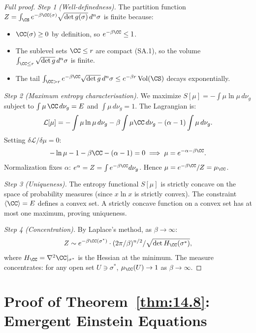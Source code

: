 \begin{proof}[Full proof]
\emph{Step 1 (Well-definedness).}
The partition function $Z = \int_{\CS} e^{-\beta\CC(\sigma)}
\sqrt{\det g(\sigma)}\,d^n\sigma$ is finite because:
\begin{itemize}
  \item $\CC(\sigma) \geq 0$ by definition, so
    $e^{-\beta\CC} \leq 1$.
  \item The sublevel sets $\CC \leq r$ are compact (SA.1),
    so the volume $\int_{\CC \leq r} \sqrt{\det g}\,d^n\sigma$
    is finite.
  \item The tail $\int_{\CC > r} e^{-\beta\CC}\sqrt{\det g}\,
    d^n\sigma \leq e^{-\beta r}\,\mathrm{Vol}(\CS)$ decays
    exponentially.
\end{itemize}

\emph{Step 2 (Maximum entropy characterisation).}
We maximize $S[\mu] = -\int \mu\ln\mu\,d\nu_g$ subject to
$\int \mu\,\CC\,d\nu_g = E$ and $\int \mu\,d\nu_g = 1$.
The Lagrangian is:
\[
  \mathcal{L}[\mu] = -\int \mu\ln\mu\,d\nu_g
  - \beta\int \mu\CC\,d\nu_g
  - (\alpha - 1)\int \mu\,d\nu_g.
\]
Setting $\delta\mathcal{L}/\delta\mu = 0$:
\[
  -\ln\mu - 1 - \beta\CC - (\alpha - 1) = 0
  \implies \mu = e^{-\alpha - \beta\CC}.
\]
Normalization fixes $\alpha$: $e^\alpha = Z = \int e^{-\beta\CC}
d\nu_g$.  Hence $\mu = e^{-\beta\CC} / Z = \mu_{\CC}$.

\emph{Step 3 (Uniqueness).}
The entropy functional $S[\mu]$ is strictly concave on the space
of probability measures (since $x \ln x$ is strictly convex).
The constraint $\langle\CC\rangle = E$ defines a convex set.
A strictly concave function on a convex set has at most one
maximum, proving uniqueness.

\emph{Step 4 (Concentration).}
By Laplace's method, as $\beta \to \infty$:
\[
  Z \sim e^{-\beta\CC(\sigma^*)}
  \cdot (2\pi/\beta)^{n/2} / \sqrt{\det H_{\CC}(\sigma^*)},
\]
where $H_{\CC} = \nabla^2\CC|_{\sigma^*}$ is the Hessian at the
minimum.  The measure concentrates: for any open set $U \ni \sigma^*$,
$\mu_{\CC}(U) \to 1$ as $\beta \to \infty$.
\end{proof}

\section{Proof of Theorem~\ref{thm:14.8}: Emergent Einstein Equations}
\label{app:pf-einstein}

